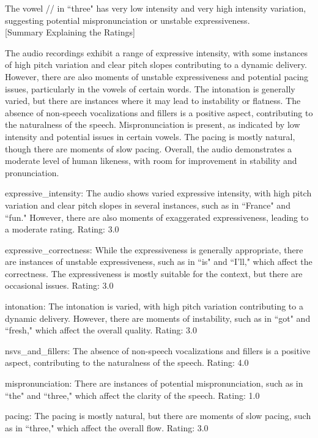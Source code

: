 \begin{tcolorbox}  

The vowel // in ``three" has very low intensity and very high intensity variation, suggesting potential mispronunciation or unstable expressiveness. \\

[Summary Explaining the Ratings]

The audio recordings exhibit a range of expressive intensity, with some instances of high pitch variation and clear pitch slopes contributing to a dynamic delivery. However, there are also moments of unstable expressiveness and potential pacing issues, particularly in the vowels of certain words. The intonation is generally varied, but there are instances where it may lead to instability or flatness. The absence of non-speech vocalizations and fillers is a positive aspect, contributing to the naturalness of the speech. Mispronunciation is present, as indicated by low intensity and potential issues in certain vowels. The pacing is mostly natural, though there are moments of slow pacing. Overall, the audio demonstrates a moderate level of human likeness, with room for improvement in stability and pronunciation.


expressive\_intensity: The audio shows varied expressive intensity, with high pitch variation and clear pitch slopes in several instances, such as in ``France" and ``fun." However, there are also moments of exaggerated expressiveness, leading to a moderate rating. Rating: 3.0


expressive\_correctness: While the expressiveness is generally appropriate, there are instances of unstable expressiveness, such as in ``is" and ``I'll," which affect the correctness. The expressiveness is mostly suitable for the context, but there are occasional issues. Rating: 3.0


intonation: The intonation is varied, with high pitch variation contributing to a dynamic delivery. However, there are moments of instability, such as in ``got" and ``fresh," which affect the overall quality. Rating: 3.0


nsvs\_and\_fillers: The absence of non-speech vocalizations and fillers is a positive aspect, contributing to the naturalness of the speech. Rating: 4.0


mispronunciation: There are instances of potential mispronunciation, such as in ``the" and ``three," which affect the clarity of the speech. Rating: 1.0


pacing: The pacing is mostly natural, but there are moments of slow pacing, such as in ``three," which affect the overall flow. Rating: 3.0



\end{tcolorbox}
